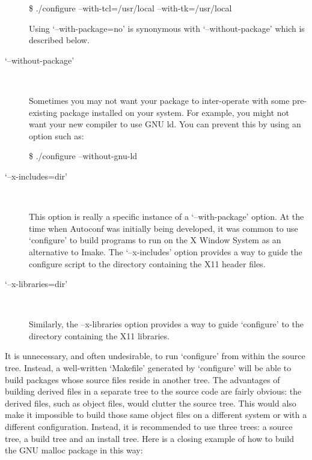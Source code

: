 \begin{description}
 
        \$ ./configure --with-tcl=/usr/local --with-tk=/usr/local



 Using `--with-package=no' is synonymous with `--without-package' which is described below. 


\item[`--without-package']
\ %

Sometimes you may not want your package to inter-operate with some pre-existing package installed on your system. For example, you might not want your new compiler to use GNU ld. You can prevent this by using an option such as: 


 
        \$ ./configure --without-gnu-ld



\item[`--x-includes=dir']
\ %

This option is really a specific instance of a `--with-package' option. At the time when Autoconf was initially being developed, it was common to use `configure' to build programs to run on the X Window System as an alternative to Imake. The `--x-includes' option provides a way to guide the configure script to the directory containing the X11 header files. 

\item[`--x-libraries=dir']
\ %

Similarly, the --x-libraries option provides a way to guide `configure' to the directory containing the X11 libraries. 
\end{description}

It is unnecessary, and often undesirable, to run `configure' from within the 
source tree. Instead, a well-written `Makefile' generated by `configure' will 
be able to build packages whose source files reside in another tree. The 
advantages of building derived files in a separate tree to the source code 
are fairly obvious: the derived files, such as object files, would clutter 
the source tree. This would also make it impossible to build those same 
object files on a different system or with a different configuration.
Instead, it is recommended to use three trees: a source tree,
a build tree and an install tree. Here is a closing example of how to 
build the GNU malloc package in this way:

